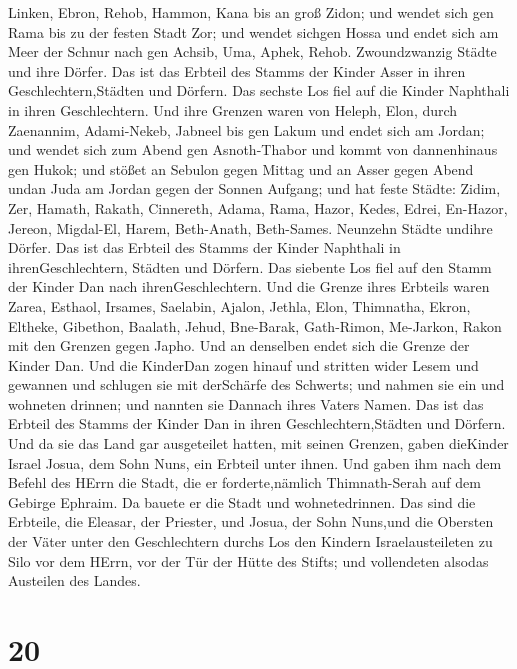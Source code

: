 Linken,  Ebron, Rehob, Hammon, Kana bis an groß Zidon;
 und wendet sich gen Rama bis zu der festen Stadt Zor; und
wendet sichgen Hossa und endet sich am Meer der Schnur nach gen Achsib,
 Uma, Aphek, Rehob. Zwoundzwanzig Städte und ihre Dörfer.
 Das ist das Erbteil des Stamms der Kinder Asser in ihren
Geschlechtern,Städten und Dörfern.  Das sechste Los fiel
auf die Kinder Naphthali in ihren Geschlechtern.  Und ihre
Grenzen waren von Heleph, Elon, durch Zaenannim, Adami-Nekeb, Jabneel
bis gen Lakum und endet sich am Jordan;  und wendet sich
zum Abend gen Asnoth-Thabor und kommt von dannenhinaus gen Hukok; und
stößet an Sebulon gegen Mittag und an Asser gegen Abend undan Juda am
Jordan gegen der Sonnen Aufgang;  und hat feste Städte:
Zidim, Zer, Hamath, Rakath, Cinnereth,  Adama, Rama, Hazor,
 Kedes, Edrei, En-Hazor,  Jereon, Migdal-El,
Harem, Beth-Anath, Beth-Sames. Neunzehn Städte undihre Dörfer.
 Das ist das Erbteil des Stamms der Kinder Naphthali in
ihrenGeschlechtern, Städten und Dörfern.  Das siebente Los
fiel auf den Stamm der Kinder Dan nach ihrenGeschlechtern. 
Und die Grenze ihres Erbteils waren Zarea, Esthaol, Irsames,
 Saelabin, Ajalon, Jethla,  Elon, Thimnatha,
Ekron,  Eltheke, Gibethon, Baalath,  Jehud,
Bne-Barak, Gath-Rimon,  Me-Jarkon, Rakon mit den Grenzen
gegen Japho.  Und an denselben endet sich die Grenze der
Kinder Dan. Und die KinderDan zogen hinauf und stritten wider Lesem und
gewannen und schlugen sie mit derSchärfe des Schwerts; und nahmen sie
ein und wohneten drinnen; und nannten sie Dannach ihres Vaters Namen.
 Das ist das Erbteil des Stamms der Kinder Dan in ihren
Geschlechtern,Städten und Dörfern.  Und da sie das Land gar
ausgeteilet hatten, mit seinen Grenzen, gaben dieKinder Israel Josua,
dem Sohn Nuns, ein Erbteil unter ihnen.  Und gaben ihm nach
dem Befehl des HErrn die Stadt, die er forderte,nämlich Thimnath-Serah
auf dem Gebirge Ephraim. Da bauete er die Stadt und wohnetedrinnen.
 Das sind die Erbteile, die Eleasar, der Priester, und
Josua, der Sohn Nuns,und die Obersten der Väter unter den Geschlechtern
durchs Los den Kindern Israelausteileten zu Silo vor dem HErrn, vor der
Tür der Hütte des Stifts; und vollendeten alsodas Austeilen des Landes.

\hypertarget{section-19}{%
\section{20}\label{section-19}}

